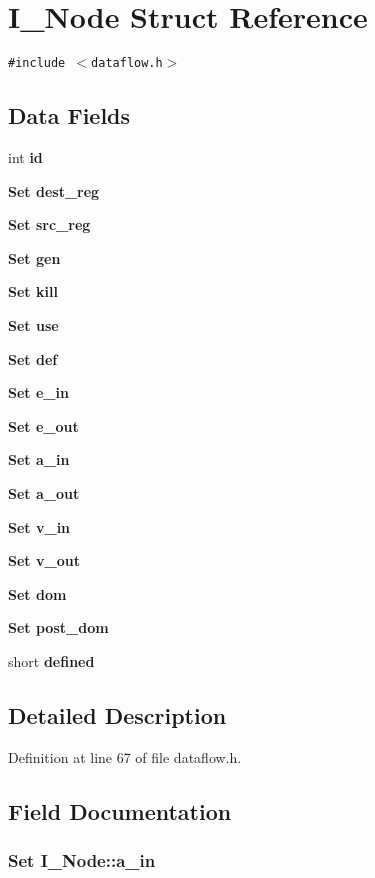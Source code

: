 \section{I\_\-Node Struct Reference}
\label{structI__Node}
{\tt \#include $<$dataflow.h$>$}

\subsection*{Data Fields}
\begin{CompactItemize}
\item 
int \bf{id}
\item 
\bf{Set} \bf{dest\_\-reg}
\item 
\bf{Set} \bf{src\_\-reg}
\item 
\bf{Set} \bf{gen}
\item 
\bf{Set} \bf{kill}
\item 
\bf{Set} \bf{use}
\item 
\bf{Set} \bf{def}
\item 
\bf{Set} \bf{e\_\-in}
\item 
\bf{Set} \bf{e\_\-out}
\item 
\bf{Set} \bf{a\_\-in}
\item 
\bf{Set} \bf{a\_\-out}
\item 
\bf{Set} \bf{v\_\-in}
\item 
\bf{Set} \bf{v\_\-out}
\item 
\bf{Set} \bf{dom}
\item 
\bf{Set} \bf{post\_\-dom}
\item 
short \bf{defined}
\end{CompactItemize}


\subsection{Detailed Description}




Definition at line 67 of file dataflow.h.

\subsection{Field Documentation}
\subsubsection{\setlength{\rightskip}{0pt plus 5cm}\bf{Set} \bf{I\_\-Node::a\_\-in}}\label{structI__Node_41d74d5383063749b6cfabfff4654000}





